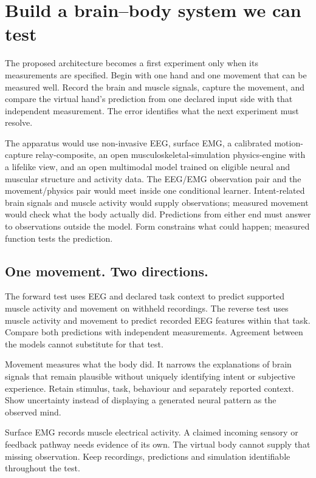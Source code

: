 \section{Build a brain--body system we can test}

The proposed architecture becomes a first experiment only when its measurements
are specified. Begin with one hand and one movement that can be measured well.
Record the brain and muscle signals, capture the movement, and compare the
virtual hand's prediction from one declared input side with that independent
measurement. The error identifies what the next experiment must resolve.

The apparatus would use non-invasive EEG, surface EMG, a calibrated
motion-capture relay-composite, an open musculoskeletal-simulation physics-engine
with a lifelike view, and an open multimodal model trained on eligible neural
and muscular structure and activity data. The EEG/EMG observation pair and the
movement/physics pair would meet inside one conditional learner. Intent-related
brain signals and muscle activity would supply observations; measured movement
would check what the body actually did. Predictions from either end must answer
to observations outside the model. Form constrains what could happen; measured
function tests the prediction.

\subsection{One movement. Two directions.}

The forward test uses EEG and declared task context to predict supported muscle
activity and movement on withheld recordings. The reverse test uses muscle
activity and movement to predict recorded EEG features within that task. Compare
both predictions with independent measurements. Agreement between the models
cannot substitute for that test.

Movement measures what the body did. It narrows the explanations of brain
signals that remain plausible without uniquely identifying intent or subjective
experience. Retain stimulus, task, behaviour and separately reported context.
Show uncertainty instead of displaying a generated neural pattern as the
observed mind.

Surface EMG records muscle electrical activity. A claimed incoming sensory or
feedback pathway needs evidence of its own. The virtual body cannot supply that
missing observation. Keep recordings, predictions and simulation identifiable
throughout the test.

